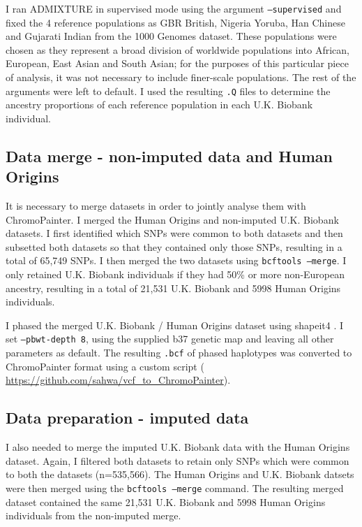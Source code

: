 I ran ADMIXTURE in supervised mode using the argument \texttt{--supervised} and fixed the 4 reference populations as GBR British, Nigeria Yoruba, Han Chinese and Gujarati Indian from the 1000 Genomes dataset. These populations were chosen as they represent a broad division of worldwide populations into African, European, East Asian and South Asian; for the purposes of this particular piece of analysis, it was not necessary to include finer-scale populations. The rest of the arguments were left to default. I used the resulting \texttt{.Q} files to determine the ancestry proportions of each reference population in each U.K. Biobank individual. 

\subsection{Data merge - non-imputed data and Human Origins}

It is necessary to merge datasets in order to jointly analyse them with ChromoPainter. I merged the Human Origins and non-imputed U.K. Biobank datasets. I first identified which SNPs were common to both datasets and then subsetted both datasets so that they contained only those SNPs, resulting in a total of 65,749 SNPs. I then merged the two datasets using \texttt{bcftools --merge}. I only retained U.K. Biobank individuals if they had 50\% or more non-European ancestry, resulting in a total of 21,531 U.K. Biobank and 5998 Human Origins individuals. 

I phased the merged U.K. Biobank / Human Origins dataset using shapeit4 \cite{delaneau2018integrative}. I set \texttt{--pbwt-depth 8}, using the supplied b37 genetic map and leaving all other parameters as default. The resulting \texttt{.bcf} of phased haplotypes was converted to ChromoPainter format using a custom script ( \url{https://github.com/sahwa/vcf_to_ChromoPainter}).  

\subsection{Data preparation - imputed data}

I also needed to merge the imputed U.K. Biobank data with the Human Origins dataset. Again, I filtered both datasets to retain only SNPs which were common to both the datasets (n=535,566). The Human Origins and U.K. Biobank datsets were then merged using the \texttt{bcftools --merge} command. The resulting merged dataset contained the same 21,531 U.K. Biobank and 5998 Human Origins individuals from the non-imputed merge.

